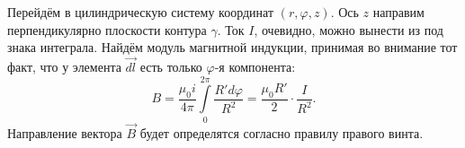Перейдём в цилиндрическую систему координат $(r,\varphi,z)$. Ось $z$ направим перпендикулярно плоскости контура $\gamma$. Ток $I$, очевидно, можно вынести из под знака интеграла. Найдём модуль магнитной индукции, принимая во внимание тот факт, что у элемента $\vec{dl}$ есть только $\varphi$-я компонента:
\begin{equation}
	B = \frac{\mu_0 i}{4 \pi}  \int \limits_0^{2 \pi} \frac{R' d \varphi}{R^2} = \frac{\mu_0 R'}{2} \cdot \frac{I}{R^2}.
	\label{eq:calcBcyl}
\end{equation}
Направление вектора $\vec{B}$ будет определятся согласно правилу правого винта.
